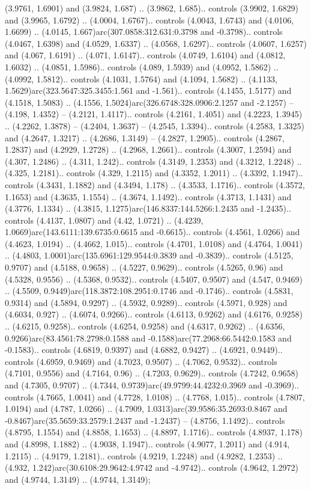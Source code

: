 (3.9761, 1.6901) and (3.9824, 1.687) .. (3.9862, 1.685).. controls (3.9902, 1.6829) and (3.9965, 1.6792) .. (4.0004, 1.6767).. controls (4.0043, 1.6743) and (4.0106, 1.6699) .. (4.0145, 1.667)arc(307.0858:312.631:0.3798 and -0.3798).. controls (4.0467, 1.6398) and (4.0529, 1.6337) .. (4.0568, 1.6297).. controls (4.0607, 1.6257) and (4.067, 1.6191) .. (4.071, 1.6147).. controls (4.0749, 1.6104) and (4.0812, 1.6032) .. (4.0851, 1.5986).. controls (4.089, 1.5939) and (4.0952, 1.5862) .. (4.0992, 1.5812).. controls (4.1031, 1.5764) and (4.1094, 1.5682) .. (4.1133, 1.5629)arc(323.5647:325.3455:1.561 and -1.561).. controls (4.1455, 1.5177) and (4.1518, 1.5083) .. (4.1556, 1.5024)arc(326.6748:328.0906:2.1257 and -2.1257) -- (4.198, 1.4352) -- (4.2121, 1.4117).. controls (4.2161, 1.4051) and (4.2223, 1.3945) .. (4.2262, 1.3878) -- (4.2404, 1.3637) -- (4.2545, 1.3394).. controls (4.2583, 1.3325) and (4.2647, 1.3217) .. (4.2686, 1.3149) -- (4.2827, 1.2905).. controls (4.2867, 1.2837) and (4.2929, 1.2728) .. (4.2968, 1.2661).. controls (4.3007, 1.2594) and (4.307, 1.2486) .. (4.311, 1.242).. controls (4.3149, 1.2353) and (4.3212, 1.2248) .. (4.325, 1.2181).. controls (4.329, 1.2115) and (4.3352, 1.2011) .. (4.3392, 1.1947).. controls (4.3431, 1.1882) and (4.3494, 1.178) .. (4.3533, 1.1716).. controls (4.3572, 1.1653) and (4.3635, 1.1554) .. (4.3674, 1.1492).. controls (4.3713, 1.1431) and (4.3776, 1.1334) .. (4.3815, 1.1275)arc(146.8337:144.5266:1.2435 and -1.2435).. controls (4.4137, 1.0807) and (4.42, 1.0721) .. (4.4239, 1.0669)arc(143.6111:139.6735:0.6615 and -0.6615).. controls (4.4561, 1.0266) and (4.4623, 1.0194) .. (4.4662, 1.015).. controls (4.4701, 1.0108) and (4.4764, 1.0041) .. (4.4803, 1.0001)arc(135.6961:129.9544:0.3839 and -0.3839).. controls (4.5125, 0.9707) and (4.5188, 0.9658) .. (4.5227, 0.9629).. controls (4.5265, 0.96) and (4.5328, 0.9556) .. (4.5368, 0.9532).. controls (4.5407, 0.9507) and (4.547, 0.9469) .. (4.5509, 0.9449)arc(118.3872:108.2951:0.1746 and -0.1746).. controls (4.5831, 0.9314) and (4.5894, 0.9297) .. (4.5932, 0.9289).. controls (4.5971, 0.928) and (4.6034, 0.927) .. (4.6074, 0.9266).. controls (4.6113, 0.9262) and (4.6176, 0.9258) .. (4.6215, 0.9258).. controls (4.6254, 0.9258) and (4.6317, 0.9262) .. (4.6356, 0.9266)arc(83.4561:78.2798:0.1588 and -0.1588)arc(77.2968:66.5442:0.1583 and -0.1583).. controls (4.6819, 0.9397) and (4.6882, 0.9427) .. (4.6921, 0.9449).. controls (4.6959, 0.9469) and (4.7023, 0.9507) .. (4.7062, 0.9532).. controls (4.7101, 0.9556) and (4.7164, 0.96) .. (4.7203, 0.9629).. controls (4.7242, 0.9658) and (4.7305, 0.9707) .. (4.7344, 0.9739)arc(49.9799:44.4232:0.3969 and -0.3969).. controls (4.7665, 1.0041) and (4.7728, 1.0108) .. (4.7768, 1.015).. controls (4.7807, 1.0194) and (4.787, 1.0266) .. (4.7909, 1.0313)arc(39.9586:35.2693:0.8467 and -0.8467)arc(35.5659:33.2579:1.2437 and -1.2437) -- (4.8756, 1.1492).. controls (4.8795, 1.1554) and (4.8858, 1.1653) .. (4.8897, 1.1716).. controls (4.8937, 1.178) and (4.8998, 1.1882) .. (4.9038, 1.1947).. controls (4.9077, 1.2011) and (4.914, 1.2115) .. (4.9179, 1.2181).. controls (4.9219, 1.2248) and (4.9282, 1.2353) .. (4.932, 1.242)arc(30.6108:29.9642:4.9742 and -4.9742).. controls (4.9642, 1.2972) and (4.9744, 1.3149) .. (4.9744, 1.3149);



